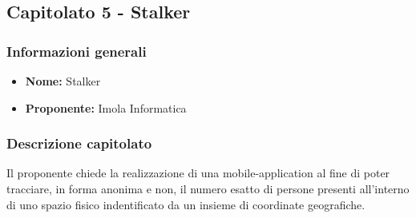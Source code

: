 \subsection{Capitolato 5 - Stalker}

	\subsubsection{Informazioni generali}
		\begin{itemize}
			\item \textbf{Nome:} Stalker
			\item \textbf{Proponente:} Imola Informatica
		\end{itemize}

	\subsubsection{Descrizione capitolato}
		Il proponente chiede la realizzazione di una mobile-application al fine di poter tracciare, in forma anonima e non, il numero esatto di persone presenti all'interno di uno spazio fisico indentificato da un insieme di coordinate geografiche.

